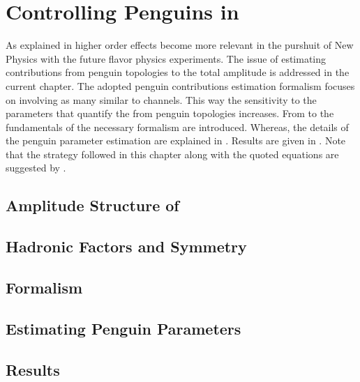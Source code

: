 
\chapter{Controlling Penguins in \phis}
\label{Penguins}

As explained in  higher order effects become more relevant in the purshuit
of New Physics with the future flavor physics experiments. The issue of estimating contributions from
penguin topologies to the total \BsJpsiPhi amplitude is addressed in the current chapter. The adopted
penguin contributions estimation formalism focuses on involving as many similar to \BsJpsiPhi channels.
This way the sensitivity to the parameters that quantify the from penguin topologies increases.
From  to  the fundamentals of the necessary formalism are introduced.
Whereas, the details of the penguin parameter estimation are explained in .
Results are given in . Note that the strategy followed in this chapter
along with the quoted equations are suggested by \cite{Fleischer:1999zi,Faller:2008gt,DeBruyn:2014oga}.

\section{Amplitude Structure of \BsJpsiPhi}
\label{jpsiphi_amp_struct}


\section{Hadronic Factors and \grpsuthree Symmetry}
\label{had_pars_suthree}


\section{Formalism}
\label{penguin_formalism}


\section{Estimating Penguin Parameters}
\label{penguin_more_chanells}


\section{Results}
\label{penguin_results}

